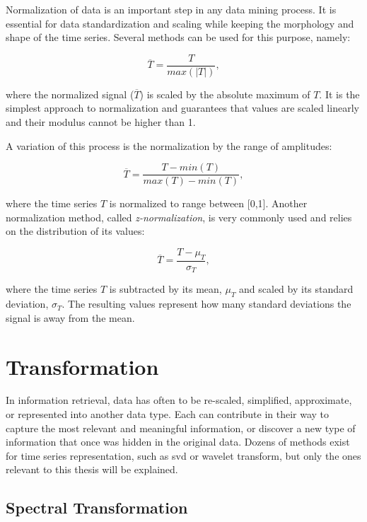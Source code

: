 Normalization of data is an important step in any data mining process. It is essential for data standardization and scaling while keeping the morphology and shape of the time series. Several methods can be used for this purpose, namely:

\begin{equation}
\overline{T} = \frac{T}{max(|T|)},
\end{equation}

where the normalized signal ($\overline{T}$) is scaled by the absolute maximum of $T$. It is the simplest approach to normalization and guarantees that values are scaled linearly and their modulus cannot be higher than 1.
\par
A variation of this process is the normalization by the range of amplitudes:

\begin{equation}
\overline{T} = \frac{T-min(T)}{max(T)-min(T)},
\end{equation}

where the time series $T$ is normalized to range between [0,1].
Another normalization method, called \textit{z-normalization}, is very commonly used and relies on the distribution of its values:

\begin{equation}
\overline{T} = \frac{T-\mu_T}{\sigma_T},
\end{equation}

where the time series $T$ is subtracted by its mean, $\mu_T$ and scaled by its standard deviation, $\sigma_T$. The resulting values represent how many standard deviations the signal is away from the mean.

\section{Transformation} 
\label{sec:transform}

In information retrieval, data has often to be re-scaled, simplified, approximate, or represented into another data type. Each can contribute in their way to capture the most relevant and meaningful information, or discover a new type of information that once was hidden in the original data. Dozens of methods exist for time series representation, such as \gls{svd} or wavelet transform, but only the ones relevant to this thesis will be explained.

\subsection{Spectral Transformation}
\label{subsec:spec_transform}

